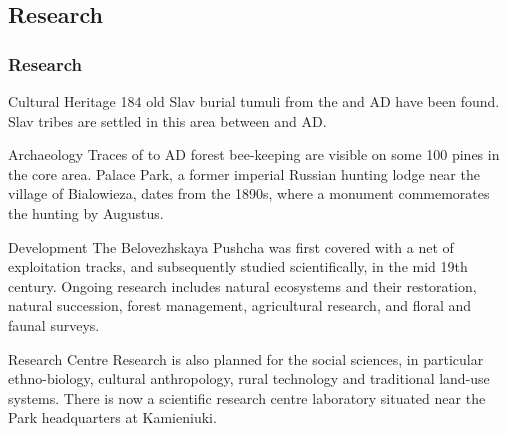 \documentclass[pdflatex,compress,8pt,
	xcolor={dvipsnames,dvipsnames,svgnames,x11names,table},
	hyperref={colorlinks = true,
	breaklinks = true, urlcolor = NavyBlue, breaklinks = true}]{beamer}
\begin{document}
\subsection{Research}
\begin{frame}\frametitle{Research}

\vspace{3em}
\begin{block}{Cultural Heritage}
184 old Slav burial tumuli from the  and  AD have been found. Slav tribes are settled in this area between  and  AD.
\end{block}

\begin{block}{Archaeology}
Traces of  to  AD forest bee-keeping are visible on some 100 pines in the core area. Palace Park, a former imperial Russian hunting lodge near the village of Bialowieza, dates from the 1890s, where a monument commemorates the hunting by Augustus.
\end{block}

\begin{alertblock}{Development}
The Belovezhskaya Pushcha was first covered with a net of exploitation tracks, and subsequently studied scientifically, in the mid 19th century.
Ongoing research includes natural ecosystems and their restoration, natural succession, forest management, agricultural research, and floral and faunal surveys.
\end{alertblock}

\begin{block}{Research Centre}
Research is also planned for the social sciences, in particular ethno-biology, cultural anthropology, rural technology and traditional land-use systems.
There is now a scientific research centre laboratory situated near the Park headquarters at Kamieniuki.
\end{block}

\end{frame}
\end{document}
